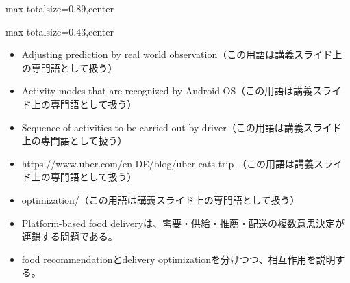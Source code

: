 \begin{minipage}[t]{0.58\textwidth}
\begin{adjustbox}{max totalsize={\textwidth}{0.89\textheight},center}
\begin{minipage}{\textwidth}
\end{minipage}
\end{adjustbox}
\end{minipage}


\clearpage
{}
\begin{minipage}[t]{0.405\textwidth}
\begin{adjustbox}{max totalsize={\textwidth}{0.43\textheight},center}
\begin{minipage}{\textwidth}\scriptsize
{}\begin{itemize}
\item Adjusting prediction by real world observation（この用語は講義スライド上の専門語として扱う）
\item Activity modes that are recognized by Android OS（この用語は講義スライド上の専門語として扱う）
\item Sequence of activities to be carried out by driver（この用語は講義スライド上の専門語として扱う）
\item https://www.uber.com/en-DE/blog/uber-eats-trip-（この用語は講義スライド上の専門語として扱う）
\item optimization/（この用語は講義スライド上の専門語として扱う）
\end{itemize}\begin{itemize}
\item Platform-based food deliveryは、需要・供給・推薦・配送の複数意思決定が連鎖する問題である。
\item food recommendationとdelivery optimizationを分けつつ、相互作用を説明する。
\end{itemize}
\end{minipage}
\end{adjustbox}
\end{minipage}\hfill
